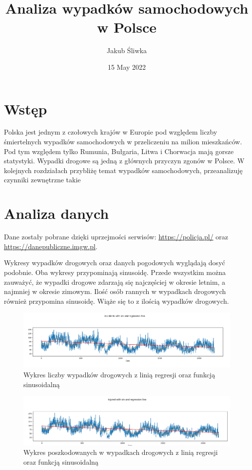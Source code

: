 \documentclass{article}
\title{Analiza wypadków samochodowych w Polsce}
\author{Jakub Śliwka}
\date{15 May 2022}
\begin{document}
\maketitle

\section{Wstęp}
Polska jest jednym z czołowych krajów w Europie pod względem liczby śmiertelnych wypadków samochodowych w przeliczeniu na milion mieszkańców.
Pod tym względem tylko Rumunia, Bułgaria, Litwa i Chorwacja mają gorsze statystyki.
Wypadki drogowe są jedną z głównych przyczyn zgonów w Polsce. W kolejnych rozdziałach przybliżę temat wypadków samochodowych, przeanalizuję czynniki zewnętrzne takie 

\section{Analiza danych}
Dane zostały pobrane dzięki uprzejmości serwisów: \url{https://policja.pl/} oraz \url{https://danepubliczne.imgw.pl}.

Wykresy wypadków drogowych oraz danych pogodowych wyglądają dosyć podobnie. Oba wykresy przypominają sinusoidę.
Przede wszystkim można zauważyć, że wypadki drogowe zdarzają się najczęściej w okresie letnim, a najmniej w okresie zimowym.
Ilość osób rannych w wypadkach drogowych również przypomina sinusoidę. Wiąże się to z ilością wypadków drogowych.

\begin{figure}[h]
    \flushleft
    \includegraphics[width=1\textwidth]{visualization/accidents_sin.png}
    \caption{Wykres liczby wypadków drogowych z linią regresji oraz funkcją sinusoidalną}
    \label{fig:accidents_sin}
\end{figure}

\begin{figure}[h]
    \flushleft
    \includegraphics[width=1\textwidth]{visualization/injured_sin.png}
    \caption{Wykres poszkodowanych w wypadkach drogowych z linią regresji oraz funkcją sinusoidalną}
    \label{fig:injured_sin}
\end{figure}
\end{document}
